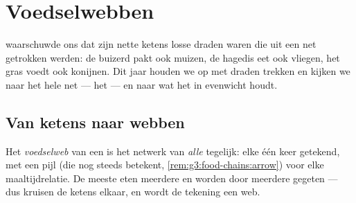 \chapter{Voedselwebben}\label{ch:g5:food-webs}

 waarschuwde ons dat zijn nette ketens losse
draden waren die uit een net getrokken werden: de buizerd pakt ook
muizen, de hagedis eet ook vliegen, het gras voedt ook konijnen. Dit
jaar houden we op met draden trekken en kijken we naar het hele net ---
het  --- en naar wat het in evenwicht houdt.

\section{Van ketens naar webben}

\begin{definition}[Voedselweb]\label{def:g5:food-webs:web}
Het \emph{voedselweb} van een  is het
netwerk van \emph{alle}  tegelijk: elke  één keer
getekend, met een pijl (die nog steeds \emph{}
betekent, \cref{rem:g3:food-chains:arrow}) voor elke maaltijdrelatie. De
meeste  eten meerdere  en worden door meerdere 
gegeten --- dus kruisen de ketens elkaar, en wordt de tekening een web.
\end{definition}

